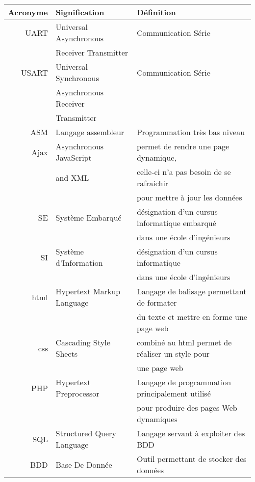 \begin{tabular}{|r|l|l|}
	\hline
	\textbf{Acronyme} & \textbf{Signification} & \textbf{Définition} \\
	\hline
   	UART & Universal Asynchronous & Communication Série \\
   	& Receiver Transmitter & \\
	\hline
	USART & Universal Synchronous & Communication Série \\
	 & Asynchronous Receiver & \\
	 & Transmitter & \\
	\hline
	ASM & Langage assembleur & Programmation très bas niveau \\
	\hline
	Ajax &  Asynchronous JavaScript & permet de rendre une page dynamique, \\
	& and XML & celle-ci n'a pas besoin de se rafraichir \\
	& & pour mettre à jour les données\\
	\hline
	SE & Système Embarqué & désignation d'un cursus informatique embarqué \\
	& & dans une école d'ingénieurs \\
	\hline
	SI & Système d'Information & désignation d'un cursus informatique \\
	& & dans une école d'ingénieurs \\
	\hline
	html & Hypertext Markup Language & Langage de balisage permettant de formater \\
	& & du texte et mettre en forme une page web \\
	\hline
	css &  Cascading Style Sheets & combiné au html permet de réaliser un style pour \\
	& & une page web\\
	\hline
	PHP & Hypertext Preprocessor & Langage de programmation principalement utilisé \\ 
	 & & pour produire des pages Web dynamiques \\
	\hline
	SQL & Structured Query Language & Langage servant à exploiter des BDD \\
	\hline
	BDD & Base De Donnée & Outil permettant de stocker des données \\
	\hline
\end{tabular}